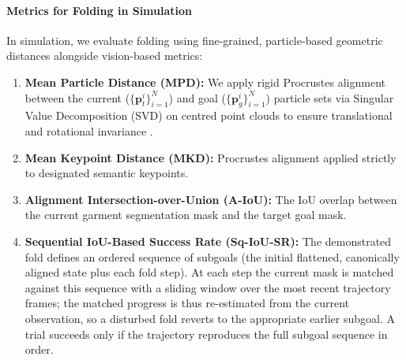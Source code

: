 \documentclass[journal]{IEEEtran}
\begin{document}
\paragraph{Metrics for Folding in Simulation}
In simulation, we evaluate folding using fine-grained, particle-based geometric distances alongside vision-based metrics:
\begin{enumerate}
    \item \textbf{Mean Particle Distance (MPD):} We apply rigid Procrustes alignment between the current ($\{\mathbf{p}_t^i\}_{i=1}^N$) and goal ($\{\mathbf{p}_g^i\}_{i=1}^N$) particle sets via Singular Value Decomposition (SVD) on centred point clouds to ensure translational and rotational invariance \cite{canberk2022cloth}.
    \item \textbf{Mean Keypoint Distance (MKD):} Procrustes alignment applied strictly to designated semantic keypoints.
    \item \textbf{Alignment Intersection-over-Union (A-IoU):} The IoU overlap between the current garment segmentation mask and the target goal mask.
    \item \textbf{Sequential IoU-Based Success Rate (Sq-IoU-SR):} The demonstrated fold defines an ordered sequence of subgoals (the initial flattened, canonically aligned state plus each fold step). At each step the current mask is matched against this sequence with a sliding window over the most recent trajectory frames; the matched progress is thus re-estimated from the current observation, so a disturbed fold reverts to the appropriate earlier subgoal. A trial succeeds only if the trajectory reproduces the full subgoal sequence in order.
\end{enumerate}
\end{document}
